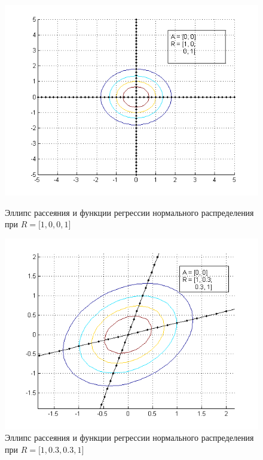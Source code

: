 \begin{figure}[h!]
  \begin{minipage}[h!]{0.47\linewidth}
    \includegraphics[width=1\linewidth]{pic/new/normal_regr_1}
    \caption{Эллипс рассеяния и функции регрессии 
       нормального распределения при
    $ R = \big[1, 0, 0, 1 \big] $
}\label{pic:normal_regr_start}
  \end{minipage}
  \hfill
  \begin{minipage}[h!]{0.47\linewidth}
    \vspace{4mm}
    \includegraphics[width=1\linewidth]{pic/new/normal_regr_2}
    \caption{Эллипс рассеяния и функции регрессии 
       нормального распределения при
      $ R = \big[1, 0.3, 0.3, 1 \big] $
    }
  \end{minipage}
\end{figure}

